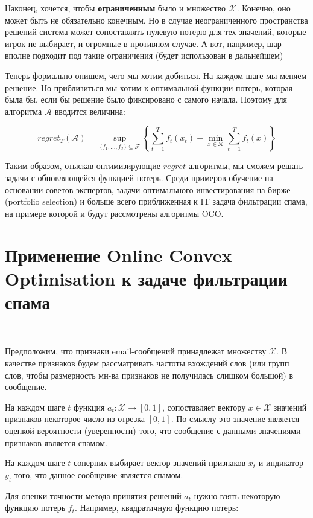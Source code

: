 \documentclass[12pt]{article}
\theoremstyle{definition}
\begin{document}
Наконец, хочется, чтобы \textbf{ограниченным} было и множество $\mathcal{K}$. Конечно, оно может быть не обязательно конечным. Но в случае неограниченного пространства решений система может сопоставлять нулевую потерю для тех значений, которые игрок не выбирает, и огромные в противном случае. А вот, например, шар вполне подходит под такие ограничения (будет использован в дальнейшем)

\bigskip
Теперь формально опишем, чего мы хотим добиться. На каждом шаге мы меняем решение. Но приблизиться мы хотим к оптимальной функции потерь, которая была бы, если бы решение было фиксировано с самого начала. Поэтому для алгоритма $\mathcal{A}$ вводится величина:

$$ regret_T(\mathcal{A}) = \sup\limits_{\{f_1, ..., f_T\} \subseteq \mathcal{F}} \left\{\sum\limits_{t=1}^T f_t(x_t) - \min\limits_{x \in \mathcal{K}} \sum\limits_{t=1}^T f_t(x)\right\} $$

Таким образом, отыскав оптимизирующие $regret$ алгоритмы, мы сможем решать задачи с обновляющейся функцией потерь. Среди примеров обучение на основании советов экспертов, задачи оптимального инвестирования на бирже (portfolio selection) и больше всего приближенная к IT задача фильтрации спама, на примере которой и будут рассмотрены алгоритмы OCO.

\section*{Применение Online Convex Optimisation к задаче фильтрации спама}
$ $

Предположим, что признаки email-сообщений принадлежат множеству $\mathcal{X}$. В качестве признаков будем рассматривать частоты вхождений слов (или групп слов, чтобы размерность мн-ва признаков не получилась слишком большой) в сообщение.

На каждом шаге $t$ функция $a_t : \mathcal{X} \rightarrow [0, 1]$, сопоставляет вектору $x \in \mathcal{X}$ значений признаков некоторое число из отрезка $[0, 1]$. По смыслу это значение является оценкой вероятности (уверенности) того, что сообщение с данными значениями признаков является спамом.

На каждом шаге $t$ соперник выбирает вектор значений признаков $x_t$ и индикатор $y_t$ того, что данное сообщение является спамом.

Для оценки точности метода принятия решений $a_t$ нужно взять некоторую функцию потерь $f_t$. Например, квадратичную функцию потерь:
\end{document}
